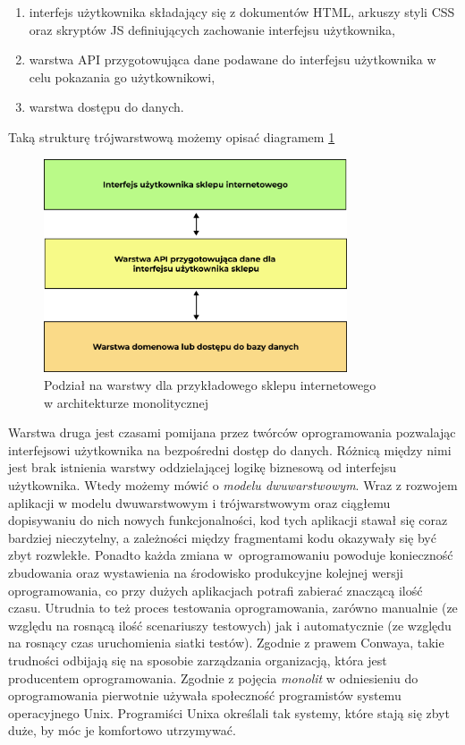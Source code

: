 \documentclass{SGGW-thesis}
\begin{document}
  \begin{enumerate}
    \item interfejs użytkownika składający się z dokumentów HTML, arkuszy styli CSS oraz skryptów JS definiujących zachowanie interfejsu użytkownika,
    \item warstwa API przygotowująca dane podawane do interfejsu użytkownika w celu pokazania go użytkownikowi,
    \item warstwa dostępu do danych.
  \end{enumerate}
  
  Taką strukturę trójwarstwową możemy opisać diagramem \ref{fig:monolith_diagram}

  \begin{figure}[h]
    \centering
    \captionsetup{justification=centering}
    \includegraphics[width=0.8\textwidth]{monolith_diagram.png}
    \caption{Podział na warstwy dla przykładowego sklepu internetowego \\ w architekturze monolitycznej}
    \label{fig:monolith_diagram}
  \end{figure}

  Warstwa druga jest czasami pomijana przez twórców oprogramowania pozwalając interfejsowi użytkownika na bezpośredni dostęp do danych. Różnicą między nimi jest brak istnienia warstwy oddzielającej logikę biznesową od interfejsu użytkownika. Wtedy możemy mówić o \textit{modelu dwuwarstwowym}.
  Wraz z rozwojem aplikacji w modelu dwuwarstwowym i trójwarstwowym oraz ciągłemu dopisywaniu do nich nowych funkcjonalności, kod tych aplikacji stawał się coraz bardziej nieczytelny, a zależności między fragmentami kodu okazywały się być zbyt rozwlekłe. 
  Ponadto każda zmiana w~oprogramowaniu powoduje konieczność zbudowania oraz wystawienia na środowisko produkcyjne kolejnej wersji oprogramowania, co przy dużych aplikacjach potrafi zabierać znaczącą ilość czasu. Utrudnia to też proces testowania oprogramowania, zarówno manualnie (ze względu na rosnącą ilość scenariuszy testowych) jak i automatycznie (ze względu na rosnący czas uruchomienia siatki testów).
  Zgodnie z prawem Conwaya, takie trudności odbijają się na sposobie zarządzania organizacją, która jest producentem oprogramowania.
  Zgodnie z \cite{fowler} pojęcia \textit{monolit} w odniesieniu do oprogramowania pierwotnie używała społeczność programistów systemu operacyjnego Unix. Programiści Unixa określali tak systemy, które stają się zbyt duże, by móc je komfortowo utrzymywać. 
\end{document}
